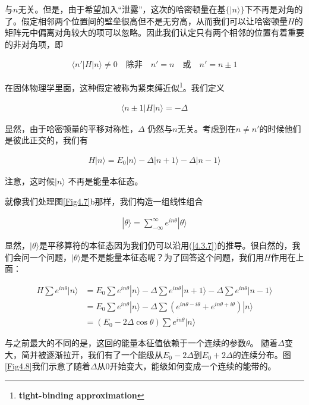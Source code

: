 \documentclass[UTF8,twoside]{ctexart}
\begin{document}
\noindent 与$n$无关。但是，由于希望加入“泄露”，这次的哈密顿量在基$\{|n\rangle\}$下不再是对角的了。假定相邻两个位置间的壁垒很高但不是无穷高，从而我们可以让哈密顿量$H$的矩阵元中偏离对角较大的项可以忽略。因此我们认定只有两个相邻的位置有着重要的非对角项，即

\begin{align}\label{4.3.9}
\langle n'|H|n\rangle \neq 0 \quad \text{除非} \quad n' = n \quad \text{或} \quad n' = n\pm1
\end{align}

\noindent 在固体物理学里面，这种假定被称为紧束缚近似\footnote{\textbf{tight-binding approximation}}。我们定义

\begin{align}
\langle n\pm 1|H|n\rangle = -\Delta
\end{align}

\noindent 显然，由于哈密顿量的平移对称性，$\Delta$ 仍然与$n$无关。考虑到在$n\neq n'$的时候他们是彼此正交的，我们有

\begin{align}
H|n\rangle = E_0|n\rangle - \Delta|n+1\rangle - \Delta |n-1\rangle
\end{align}

\noindent 注意，这时候$|n\rangle$ 不再是能量本征态。

就像我们处理图{\ref{Fig4.7}b}那样，我们构造一组线性组合

\begin{align}\label{4.3.12}
|\theta\rangle = \sum_{-\infty}^{\infty}e^{in\theta}|\theta\rangle
\end{align}

\noindent 显然，$|\theta\rangle$是平移算符的本征态因为我们仍可以沿用(\ref{4.3.7})的推导。很自然的，我们会问一个问题，$|\theta\rangle$是不是能量本征态呢？为了回答这个问题，我们用$H$作用在上面：

\begin{equation}\label{4.3.13}
\begin{split}
H\sum e^{in\theta}|n\rangle &= E_0 \sum e^{in\theta}|n\rangle - \Delta \sum e^{in\theta}|n+1\rangle - \Delta\sum e^{in\theta}|n-1\rangle\\
&=E_0\sum e^{in\theta}|n\rangle - \Delta\sum(e^{in\theta - i\theta} + e^{in\theta + i\theta})|n\rangle\\
&= (E_0 - 2\Delta\cos\theta)\sum e^{in\theta}|n\rangle
\end{split}
\end{equation}

\noindent 与之前最大的不同的是，这回的能量本征值依赖于一个连续的参数$\theta$。 随着$\Delta$变大，简并被逐渐拉开，我们有了一个能级从$E_0-2\Delta$到$E_0+2\Delta$的连续分布。图{\ref{Fig4.8}}我们示意了随着$\Delta$从$0$开始变大，能级如何变成一个连续的能带的。
\end{document}
